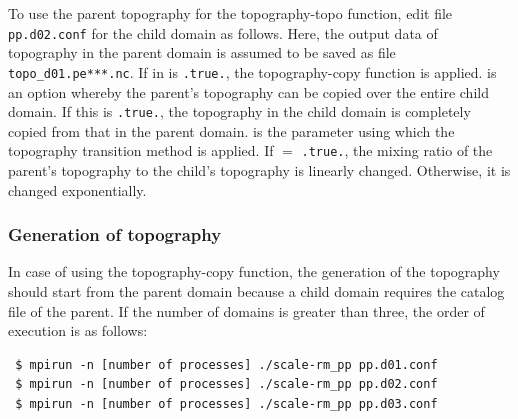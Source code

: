 To use the parent topography for the topography-topo function, edit file \verb|pp.d02.conf| for the child domain as follows.
Here, the output data of topography in the parent domain is assumed to be saved as file \verb|topo_d01.pe***.nc|.
If  in  is \verb|.true.|, the topography-copy function is applied.
 is an option whereby the parent’s topography can be copied over the entire child domain. If this is \verb|.true.|, the topography in the child domain is completely copied from that in the parent domain.  is the parameter using which the topography transition method is applied. If  $=$ \verb|.true.|, the mixing ratio of the parent’s topography to the child’s topography is linearly changed. Otherwise, it is changed exponentially.

\subsubsection{Generation of topography}
In case of using the topography-copy function, the generation of the topography should start from the parent domain  because a child domain requires the catalog  file of the parent. If the number of domains is greater than three, the order of execution is as follows: 
\begin{verbatim}
 $ mpirun -n [number of processes] ./scale-rm_pp pp.d01.conf
 $ mpirun -n [number of processes] ./scale-rm_pp pp.d02.conf
 $ mpirun -n [number of processes] ./scale-rm_pp pp.d03.conf
\end{verbatim}


